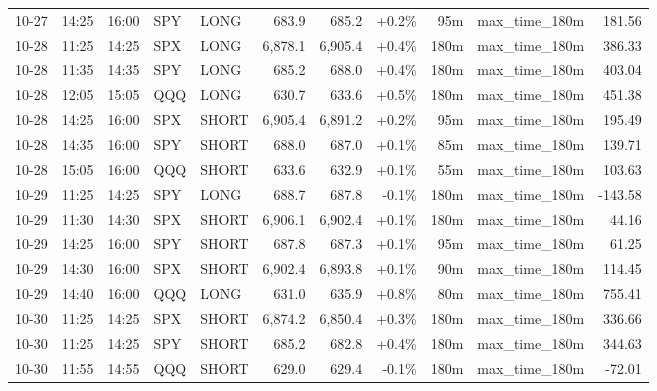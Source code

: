 \documentclass[11pt,a4paper,twoside]{article}
\begin{document}
\begin{center}
\begin{longtable}{>{\color{txtmain}}l l l l l r r r r >{\color{txtmain}}l r}
10-27 & 14:25 & 16:00 & SPY & LONG & 683.9 & 685.2 & \textcolor{wingreen}{+0.2\%} & 95m & max\_time\_180m & \textcolor{wingreen}{181.56} \\
10-28 & 11:25 & 14:25 & SPX & LONG & 6,878.1 & 6,905.4 & \textcolor{wingreen}{+0.4\%} & 180m & max\_time\_180m & \textcolor{wingreen}{386.33} \\
10-28 & 11:35 & 14:35 & SPY & LONG & 685.2 & 688.0 & \textcolor{wingreen}{+0.4\%} & 180m & max\_time\_180m & \textcolor{wingreen}{403.04} \\
10-28 & 12:05 & 15:05 & QQQ & LONG & 630.7 & 633.6 & \textcolor{wingreen}{+0.5\%} & 180m & max\_time\_180m & \textcolor{wingreen}{451.38} \\
10-28 & 14:25 & 16:00 & SPX & SHORT & 6,905.4 & 6,891.2 & \textcolor{wingreen}{+0.2\%} & 95m & max\_time\_180m & \textcolor{wingreen}{195.49} \\
10-28 & 14:35 & 16:00 & SPY & SHORT & 688.0 & 687.0 & \textcolor{wingreen}{+0.1\%} & 85m & max\_time\_180m & \textcolor{wingreen}{139.71} \\
10-28 & 15:05 & 16:00 & QQQ & SHORT & 633.6 & 632.9 & \textcolor{wingreen}{+0.1\%} & 55m & max\_time\_180m & \textcolor{wingreen}{103.63} \\
10-29 & 11:25 & 14:25 & SPY & LONG & 688.7 & 687.8 & \textcolor{lossred}{-0.1\%} & 180m & max\_time\_180m & \textcolor{lossred}{-143.58} \\
10-29 & 11:30 & 14:30 & SPX & SHORT & 6,906.1 & 6,902.4 & \textcolor{wingreen}{+0.1\%} & 180m & max\_time\_180m & \textcolor{wingreen}{44.16} \\
10-29 & 14:25 & 16:00 & SPY & SHORT & 687.8 & 687.3 & \textcolor{wingreen}{+0.1\%} & 95m & max\_time\_180m & \textcolor{wingreen}{61.25} \\
10-29 & 14:30 & 16:00 & SPX & SHORT & 6,902.4 & 6,893.8 & \textcolor{wingreen}{+0.1\%} & 90m & max\_time\_180m & \textcolor{wingreen}{114.45} \\
10-29 & 14:40 & 16:00 & QQQ & LONG & 631.0 & 635.9 & \textcolor{wingreen}{+0.8\%} & 80m & max\_time\_180m & \textcolor{wingreen}{755.41} \\
10-30 & 11:25 & 14:25 & SPX & SHORT & 6,874.2 & 6,850.4 & \textcolor{wingreen}{+0.3\%} & 180m & max\_time\_180m & \textcolor{wingreen}{336.66} \\
10-30 & 11:25 & 14:25 & SPY & SHORT & 685.2 & 682.8 & \textcolor{wingreen}{+0.4\%} & 180m & max\_time\_180m & \textcolor{wingreen}{344.63} \\
10-30 & 11:55 & 14:55 & QQQ & SHORT & 629.0 & 629.4 & \textcolor{lossred}{-0.1\%} & 180m & max\_time\_180m & \textcolor{lossred}{-72.01} \\

\end{longtable}
\end{center}
\end{document}
